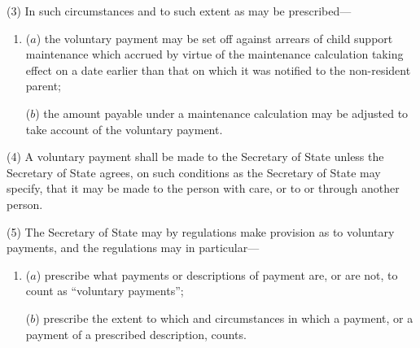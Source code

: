 \documentclass[12pt,a4paper]{article}
\begin{document}
(3) In such circumstances and to such extent as may be prescribed—
\begin{enumerate}\item[]
($a$) the voluntary payment may be set off against arrears of child support maintenance which accrued by virtue of the maintenance calculation taking effect on a date earlier than that on which it was notified to the non-resident parent;

($b$) the amount payable under a maintenance calculation may be adjusted to take account of the voluntary payment.
\end{enumerate}

(4) A voluntary payment shall be made to the 
Secretary of State  %
unless 
the Secretary of State  %
agrees, on such conditions as 
the Secretary of State  %
may specify, that it may be made to the person with care, or to or through another person.

(5) The Secretary of State may by regulations make provision as to voluntary payments, and the regulations may in particular—
\begin{enumerate}\item[]
($a$) prescribe what payments or descriptions of payment are, or are not, to count as “voluntary payments”;

($b$) prescribe the extent to which and circumstances in which a payment, or a payment of a prescribed description, counts.
\end{enumerate}

\end{document}
